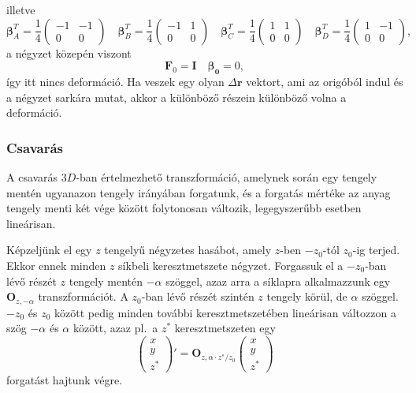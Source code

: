 \documentclass[12pt,a4paper]{scrartcl}
\let\mathbf\bm
\begin{document}
illetve
\[{\mathbf{\beta }}_A^T = \frac{1}{4}\left( {\begin{array}{*{20}{c}}
  { - 1}&{ - 1} \\ 
  0&0 
\end{array}} \right)\quad {\mathbf{\beta }}_B^T = \frac{1}{4}\left( {\begin{array}{*{20}{c}}
  { - 1}&1 \\ 
  0&0 
\end{array}} \right)\quad {\mathbf{\beta }}_C^T = \frac{1}{4}\left( {\begin{array}{*{20}{c}}
  1&1 \\ 
  0&0 
\end{array}} \right)\quad {\mathbf{\beta }}_D^T = \frac{1}{4}\left( {\begin{array}{*{20}{c}}
  1&{ - 1} \\ 
  0&0 
\end{array}} \right),\]
a négyzet közepén viszont \[{{\mathbf{F}}_0} = {\mathbf{I}}\quad {\mathbf{\beta_0 }} = 0,\]
így itt nincs deformáció. Ha veszek egy olyan $\Delta {\mathbf{r}}$ vektort, ami az origóból indul és a négyzet sarkára mutat, akkor a különböző részein különböző volna a deformáció.
\normalsize

\subsubsection{Csavarás}
A csavarás $3D$-ban értelmezhető transzformáció, amelynek során egy tengely mentén ugyanazon tengely irányában forgatunk, és a forgatás mértéke az anyag tengely menti két vége között folytonosan változik, legegyszerűbb esetben lineárisan.

Képzeljünk el egy $z$ tengelyű négyzetes hasábot, amely $z$-ben $-z_0$-tól $z_0$-ig terjed. Ekkor ennek minden $z$ síkbeli keresztmetszete négyzet. Forgassuk el a $-z_0$-ban lévő részét $z$ tengely mentén $-\alpha$ szöggel, azaz arra a síklapra alkalmazzunk egy ${{\mathbf{O}}_{z, - \alpha }}$ transzformációt. A $z_0$-ban lévő részét szintén $z$ tengely körül, de $\alpha$ szöggel. $-z_0$ és $z_0$ között pedig minden további keresztmetszetében lineárisan változzon a szög $-\alpha$ és $\alpha$ között, azaz pl.\ a $z^*$ keresztmetszeten egy 
\begin{equation}
\left( {\begin{array}{*{20}{c}}
  x \\ 
  y \\ 
  {{z^ * }} 
\end{array}} \right)' = {{\mathbf{O}}_{z,\alpha  \cdot {z^ * }/z_0}} \left( {\begin{array}{*{20}{c}}
  x \\ 
  y \\ 
  {{z^ * }} 
\end{array}} \right)
\end{equation}
forgatást hajtunk végre.
\end{document}
